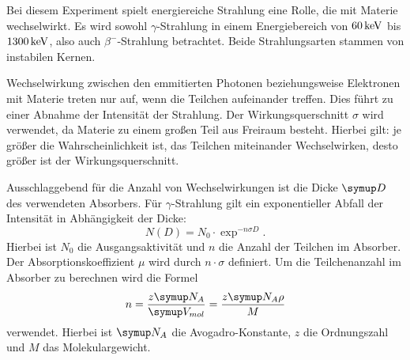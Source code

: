Bei diesem Experiment spielt energiereiche Strahlung eine Rolle, die mit Materie
wechselwirkt. Es wird sowohl $\gamma$-Strahlung in einem Energiebereich von
$60\,\si{\kilo\electronvolt}$ bis $1300\,\si{\kilo\electronvolt}$, also auch $\beta^{-}$-Strahlung betrachtet. Beide
Strahlungsarten stammen von instabilen Kernen.

Wechselwirkung zwischen den emmitierten Photonen beziehungsweise Elektronen mit
Materie treten nur auf, wenn die Teilchen aufeinander treffen. Dies führt zu einer
Abnahme der Intensität der Strahlung.
Der Wirkungsquerschnitt $\sigma$ wird verwendet, da Materie zu einem großen Teil
aus Freiraum besteht. Hierbei gilt: je größer die Wahrscheinlichkeit ist, das
Teilchen miteinander Wechselwirken, desto größer ist der Wirkungsquerschnitt.

Ausschlaggebend für die Anzahl von Wechselwirkungen ist die Dicke $\su{D}$ des
verwendeten Absorbers. Für $\gamma$-Strahlung gilt ein exponentieller Abfall der
Intensität in Abhängigkeit der Dicke:
\begin{equation}
  N(D) = N_0 \cdot \exp^{-n\sigma D}.
\end{equation}
Hierbei ist $N_0$ die Ausgangsaktivität und $n$ die Anzahl der Teilchen im Absorber.
Der Absorptionskoeffizient $\mu$ wird durch $n\cdot\sigma$ definiert. Um die
Teilchenanzahl im Absorber zu berechnen wird die Formel
\begin{equation}
  n = \frac{z\su{N_A}}{\su{V_{mol}}} = \frac{z\su{N_A}\rho}{M}
\end{equation}
verwendet. Hierbei ist $\su{N_A}$ die Avogadro-Konstante, $z$ die Ordnungszahl
und $M$ das Molekulargewicht.

